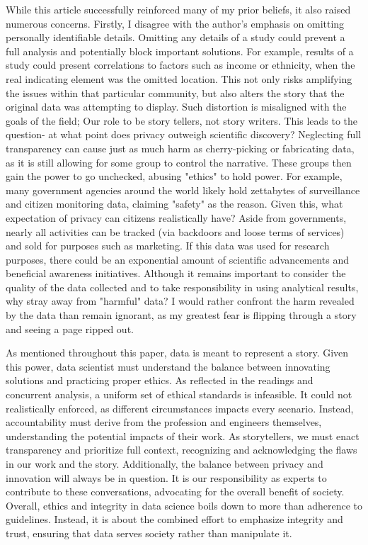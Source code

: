 \documentclass[12pt]{article}
\begin{document}
\begin{text}
While this article successfully reinforced many of my prior beliefs, it also raised numerous concerns. Firstly, I disagree with the author's emphasis on omitting personally identifiable details. Omitting any details of a study could prevent a full analysis and potentially block important solutions. For example, results of a study could present correlations to factors such as income or ethnicity, when the real indicating element was the omitted location. This not only risks amplifying the issues within that particular community, but also alters the story that the original data was attempting to display. Such distortion is misaligned with the goals of the field; Our role to be story tellers, not story writers. This leads to the question- at what point does privacy outweigh scientific discovery? Neglecting full transparency can cause just as much harm as cherry-picking or fabricating data, as it is still allowing for some group to control the narrative. These groups then gain the power to go unchecked, abusing "ethics" to hold power. For example, many government agencies around the world likely hold zettabytes of surveillance and citizen monitoring data, claiming "safety" as the reason. Given this, what expectation of privacy can citizens realistically have? Aside from governments, nearly all activities can be tracked (via backdoors and loose terms of services) and sold for purposes such as marketing. If this data was used for research purposes, there could be an exponential amount of scientific advancements and beneficial awareness initiatives. Although it remains important to consider the quality of the data collected and to take responsibility in using analytical results, why stray away from "harmful" data? I would rather confront the harm revealed by the data than remain ignorant, as my greatest fear is flipping through a story and seeing a page ripped out.

As mentioned throughout this paper, data is meant to represent a story. Given this power, data scientist must understand the balance between innovating solutions and practicing proper ethics. As reflected in the readings and concurrent analysis, a uniform set of ethical standards is infeasible. It could not realistically enforced, as different circumstances impacts every scenario. Instead, accountability must derive from the profession and engineers themselves, understanding the potential impacts of their work. As storytellers, we must enact transparency and prioritize full context, recognizing and acknowledging the flaws in our work and the story. Additionally, the balance between privacy and innovation will always be in question. It is our responsibility as experts to contribute to these conversations, advocating for the overall benefit of society. Overall, ethics and integrity in data science boils down to more than adherence to guidelines. Instead, it is about the combined effort to emphasize integrity and trust, ensuring that data serves society rather than manipulate it.

\end{text}
\end{document}
